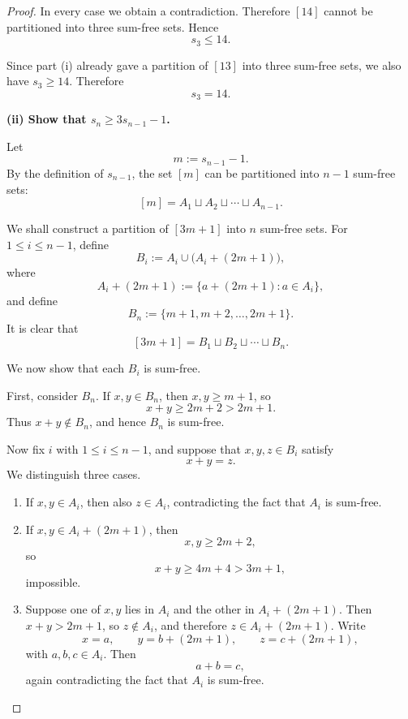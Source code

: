\documentclass[11pt, a4paper]{ctexrep}
\begin{document}
\begin{proof}
    In every case we obtain a contradiction. Therefore $[14]$ cannot be partitioned into three sum-free sets. Hence
    \[
        s_3\le 14.
    \]

    Since part (i) already gave a partition of $[13]$ into three sum-free sets, we also have $s_3\ge 14$. Therefore
    \[
        s_3=14.
    \]

    \medskip

    \noindent\textbf{(ii) Show that $s_n\ge 3s_{n-1}-1$.}

    \smallskip

    Let
    \[
        m:=s_{n-1}-1.
    \]
    By the definition of $s_{n-1}$, the set $[m]$ can be partitioned into $n-1$ sum-free sets:
    \[
        [m]=A_1\sqcup A_2\sqcup \cdots \sqcup A_{n-1}.
    \]

    We shall construct a partition of $[3m+1]$ into $n$ sum-free sets. For $1\le i\le n-1$, define
    \[
        B_i:=A_i\cup \bigl(A_i+(2m+1)\bigr),
    \]
    where
    \[
        A_i+(2m+1):=\{a+(2m+1):a\in A_i\},
    \]
    and define
    \[
        B_n:=\{m+1,m+2,\dots,2m+1\}.
    \]
    It is clear that
    \[
        [3m+1]=B_1\sqcup B_2\sqcup \cdots \sqcup B_n.
    \]

    We now show that each $B_i$ is sum-free.

    First, consider $B_n$. If $x,y\in B_n$, then $x,y\ge m+1$, so
    \[
        x+y\ge 2m+2>2m+1.
    \]
    Thus $x+y\notin B_n$, and hence $B_n$ is sum-free.

    Now fix $i$ with $1\le i\le n-1$, and suppose that $x,y,z\in B_i$ satisfy
    \[
        x+y=z.
    \]
    We distinguish three cases.

    \begin{enumerate}
        \item If $x,y\in A_i$, then also $z\in A_i$, contradicting the fact that $A_i$ is sum-free.

        \item If $x,y\in A_i+(2m+1)$, then
              \[
                  x,y\ge 2m+2,
              \]
              so
              \[
                  x+y\ge 4m+4>3m+1,
              \]
              impossible.

        \item Suppose one of $x,y$ lies in $A_i$ and the other in $A_i+(2m+1)$. Then $x+y>2m+1$, so $z\notin A_i$, and therefore $z\in A_i+(2m+1)$. Write
              \[
                  x=a,\qquad y=b+(2m+1),\qquad z=c+(2m+1),
              \]
              with $a,b,c\in A_i$. Then
              \[
                  a+b=c,
              \]
              again contradicting the fact that $A_i$ is sum-free.
    \end{enumerate}


\end{proof}
\end{document}
